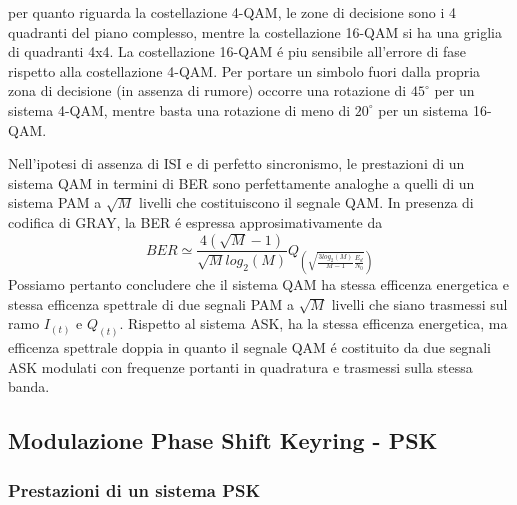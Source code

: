         \begin{figure}[H]
            \centering
            \hfill
        \end{figure}
        per quanto riguarda la costellazione 4-QAM, le zone di decisione sono i 4 quadranti del piano complesso, mentre
        la costellazione 16-QAM si ha una griglia di quadranti 4x4. La costellazione 16-QAM é piu sensibile all'errore 
        di fase rispetto alla costellazione 4-QAM. Per portare un simbolo fuori dalla propria zona di decisione 
        (in assenza di rumore) occorre una rotazione di $45^\circ$ per un sistema 4-QAM, mentre basta una rotazione di 
        meno di $20^\circ$ per un sistema 16-QAM.

        Nell'ipotesi di assenza di ISI e di perfetto sincronismo, le prestazioni di un sistema QAM in termini di BER 
        sono perfettamente analoghe a quelli di un sistema PAM a $\sqrt{M}$ livelli che costituiscono il segnale QAM.
        In presenza di codifica di GRAY, la BER é espressa approsimativamente da 
        \[
            BER \simeq \frac{4(\sqrt{M}-1)}{\sqrt{M}log_2(M)}Q_{\displaystyle \left(\sqrt{\frac{3log_2(M)}{M-1}\frac{E_d}{N_0}}\right)}  
        \]
        Possiamo pertanto concludere che il sistema QAM ha stessa efficenza energetica e stessa efficenza spettrale di due segnali PAM
        a $\sqrt{M}$ livelli che siano trasmessi sul ramo $I_{(t)}$ e $Q_{(t)}$. Rispetto al sistema ASK, ha la stessa efficenza energetica,
        ma efficenza spettrale doppia in quanto il segnale QAM é costituito da due segnali ASK modulati con frequenze portanti in 
        quadratura e trasmessi sulla stessa banda.

    \subsection{Modulazione Phase Shift Keyring - PSK}

        \subsubsection{Prestazioni di un sistema PSK}
    
